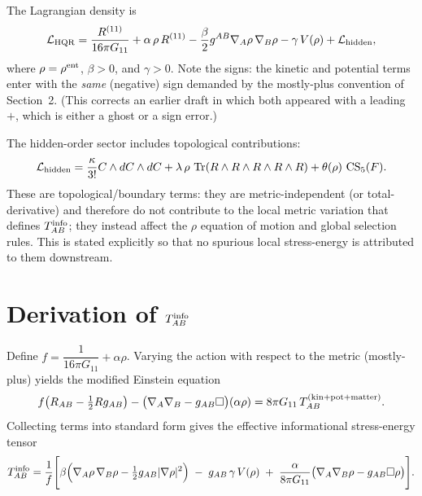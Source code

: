 \documentclass[11pt,a4paper]{article}
\begin{document}
The Lagrangian density is
\begin{equation}
\mathcal{L}_{\rm HQR} = \frac{R^{(11)}}{16\pi G_{11}}
+ \alpha \, \rho \, R^{(11)}
- \frac{\beta}{2} g^{AB} \nabla_A \rho \, \nabla_B \rho
- \gamma \, V(\rho)
+ \mathcal{L}_{\rm hidden},
\end{equation}
where \(\rho = \rho^{\rm ent}\), \(\beta>0\), and \(\gamma>0\). Note the signs:
the kinetic and potential terms enter with the \emph{same} (negative) sign
demanded by the mostly-plus convention of Section~2. (This corrects an earlier
draft in which both appeared with a leading \(+\), which is either a ghost or a
sign error.)

The hidden-order sector includes topological contributions:
\begin{equation}
\mathcal{L}_{\rm hidden} = \frac{\kappa}{3!} C \wedge dC \wedge dC
+ \lambda \, \rho \, \operatorname{Tr}(R \wedge R \wedge R \wedge R \wedge R)
+ \theta(\rho) \, \operatorname{CS}_5(F).
\end{equation}
These are topological/boundary terms: they are metric-independent (or
total-derivative) and therefore do not contribute to the local metric variation
that defines \(T^{\rm info}_{AB}\); they instead affect the \(\rho\) equation of
motion and global selection rules. This is stated explicitly so that no
spurious local stress-energy is attributed to them downstream.

\section{Derivation of \( T^{\rm info}_{AB} \)}

Define \( f = \dfrac{1}{16\pi G_{11}} + \alpha \rho \). Varying the action with
respect to the metric (mostly-plus) yields the modified Einstein equation
\begin{equation}
f \big( R_{AB} - \tfrac12 R g_{AB} \big)
- \big( \nabla_A \nabla_B - g_{AB} \square \big)(\alpha \rho)
= 8\pi G_{11} \, T_{AB}^{\rm (kin+pot+matter)} .
\end{equation}
Collecting terms into standard form gives the effective informational
stress-energy tensor
\begin{equation}
T_{AB}^{\rm info} = \frac{1}{f} \Bigg[
\beta \Big( \nabla_A \rho \, \nabla_B \rho - \tfrac12 g_{AB} |\nabla\rho|^2 \Big)
\;-\; g_{AB}\, \gamma\, V(\rho)
\;+\; \frac{\alpha}{8\pi G_{11}} \big( \nabla_A \nabla_B \rho - g_{AB} \square \rho \big)
\Bigg].
\end{equation}
\end{document}
